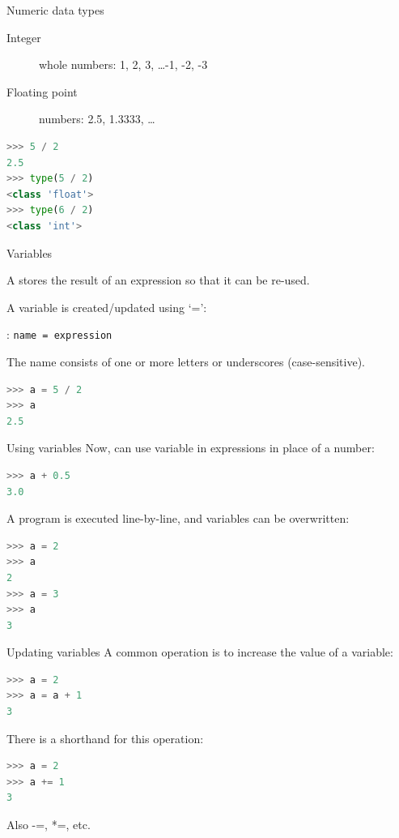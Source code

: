 \documentclass[aspectratio=169,usenames,dvipsnames]{beamer}
\begin{document}
\begin{frame}[fragile]{Numeric data types}
    \begin{description}
        \item[Integer] whole numbers: 1, 2, 3, \dots -1, -2, -3
        \item[Floating point] numbers: 2.5, 1.3333, \dots
    \end{description}

\pause
\begin{lstlisting}[language=python]
>>> 5 / 2
2.5
>>> type(5 / 2)
<class 'float'>
>>> type(6 / 2)
<class 'int'>
\end{lstlisting}
\end{frame}

\begin{frame}[fragile]{Variables}
    \begin{definition}
        A  stores the result of an expression
        so that it can be re-used.
    \end{definition}

A variable is created/updated using `=':

\begin{definition}
: \texttt{name = expression}

The name consists of one or more letters or underscores (case-sensitive).
\end{definition}

\begin{lstlisting}[language=python]
>>> a = 5 / 2
>>> a
2.5
\end{lstlisting}
\end{frame}

\begin{frame}[fragile]{Using variables}
Now, can use variable in expressions in place of a number:

\begin{lstlisting}[language=python]
>>> a + 0.5
3.0
\end{lstlisting}

\pause
A program is executed line-by-line, and variables can be overwritten:
\begin{lstlisting}[language=python]
>>> a = 2
>>> a
2
>>> a = 3
>>> a
3
\end{lstlisting}
\end{frame}


\begin{frame}[fragile]{Updating variables}
A common operation is to increase the value of a variable:
\begin{lstlisting}[language=python]
>>> a = 2
>>> a = a + 1
3
\end{lstlisting}

\pause
There is a shorthand for this operation:
\begin{lstlisting}[language=python]
>>> a = 2
>>> a += 1
3
\end{lstlisting}

Also -=, *=, etc.
\end{frame}
\end{document}
